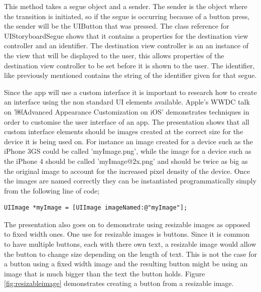 \documentclass[12pt]{report}
\begin{document}
This method takes a segue object and a sender. The sender is the object where the transition is initiated, so if the segue is occurring because of a button press, the sender will be the UIButton that was pressed. The class reference for UIStoryboardSegue \cite{segue} shows that it contains a properties for the destination view controller and an identifier. The destination view controller is an an instance of the view that will be displayed to the user, this allows properties of the destination view controller to be set before it is shown to the user. The identifier, like previously mentioned contains the string of the identifier given for that segue.

Since the app will use a custom interface it is important to research how to create an interface using the non standard UI elements available. Apple's WWDC talk on '￼Advanced Appearance Customization on iOS' \cite{appearanceios} demonstrates techniques in order to customise the user interface of an app. The presentation shows that all custom interface elements should be images created at the correct size for the device it is being used on. For instance an image created for a device such as the iPhone 3GS could be called 'myImage.png', while the image for a device such as the iPhone 4 should be called 'myImage@2x.png' and should be twice as big as the original image to account for the increased pixel density of the device. Once the images are named correctly they can be instantiated programmatically simply from the following line of code;

\begin{verbatim}
UIImage *myImage = [UIImage imageNamed:@"myImage"];
\end{verbatim}

The presentation also goes on to demonstrate using resizable images as opposed to fixed width ones. One use for resizable images is buttons. Since it is common to have multiple buttons, each with there own text, a resizable image would allow the button to change size depending on the length of text. This is not the case for a button using a fixed width image and the resulting button might be using an image that is much bigger than the text the button holds. Figure \ref{fig:resizableimage} demonstrates creating a button from a resizable image.
\end{document}
